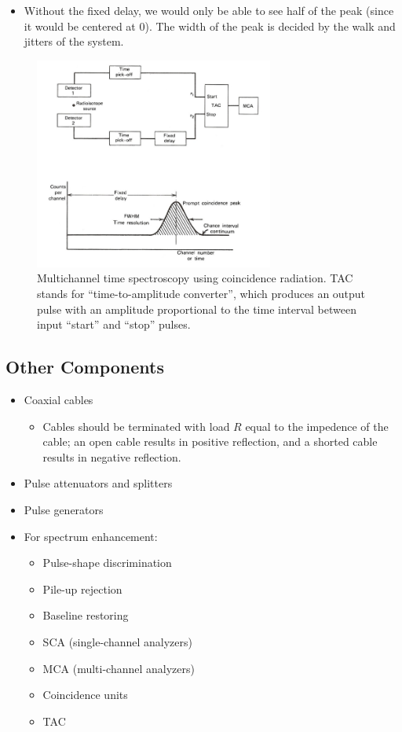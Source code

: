 \begin{itemize}
\begin{itemize}
        \item Without the fixed delay, we would only be able to see half of the peak (since it would be centered at 0). The width of the peak is decided by the walk and jitters of the system. 
    \end{itemize}
    \begin{figure}[ht]
        \centering
        \includegraphics[width=0.7\textwidth]{images/prompt_and_chance_coincidence.png}
        \caption{Multichannel time spectroscopy using coincidence radiation. TAC stands for ``time-to-amplitude converter'', which produces an output pulse with an amplitude proportional to the time interval between input ``start'' and ``stop'' pulses.}
        \label{fig:prompt_and_chance_coincidence}
    \end{figure}
\end{itemize}
\subsection{Other Components}
\begin{itemize}
    \item Coaxial cables
    \begin{itemize}
        \item Cables should be terminated with load $R$ equal to the impedence of the cable; an open cable results in positive reflection, and a shorted cable results in negative reflection.
    \end{itemize}
    \item Pulse attenuators and splitters
    \item Pulse generators
    \item For spectrum enhancement:
    \begin{itemize}
        \item Pulse-shape discrimination
        \item Pile-up rejection
        \item Baseline restoring
        \item SCA (single-channel analyzers)
        \item MCA (multi-channel analyzers)
        \item Coincidence units
        \item TAC
    \end{itemize}
\end{itemize}
